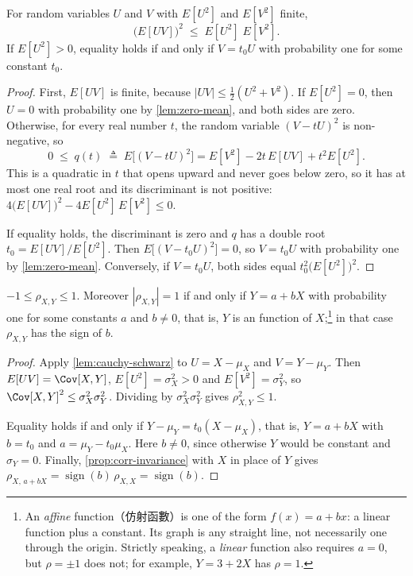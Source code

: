 \begin{lemma}\label{lem:cauchy-schwarz}
	For random variables $U$ and $V$ with $E[U^{2}]$ and $E[V^{2}]$ finite,
	\[
		\bigl(E[UV]\bigr)^{2} \;\le\; E[U^{2}]\;E[V^{2}] .
	\]
	If $E[U^{2}]>0$, equality holds if and only if $V=t_{0}U$ with probability one for some constant $t_{0}$.
\end{lemma}

\begin{proof}
	First, $E[UV]$ is finite, because $|UV|\le\tfrac12(U^{2}+V^{2})$.
	If $E[U^{2}]=0$, then $U=0$ with probability one by \autoref{lem:zero-mean}, and both sides are zero.
	Otherwise, for every real number $t$, the random variable $(V-tU)^{2}$ is non-negative, so
	\[
		0 \;\le\; q(t) \;\triangleq\; E\bigl[(V-tU)^{2}\bigr]
		= E[V^{2}] - 2t\,E[UV] + t^{2}E[U^{2}] .
	\]
	This is a quadratic in $t$ that opens upward and never goes below zero, so it has at most one real root and its discriminant is not positive:
	$4\bigl(E[UV]\bigr)^{2}-4E[U^{2}]\,E[V^{2}]\le0$.

	If equality holds, the discriminant is zero and $q$ has a double root $t_{0}=E[UV]/E[U^{2}]$.
	Then $E\bigl[(V-t_{0}U)^{2}\bigr]=0$, so $V=t_{0}U$ with probability one by \autoref{lem:zero-mean}.
	Conversely, if $V=t_{0}U$, both sides equal $t_{0}^{2}\bigl(E[U^{2}]\bigr)^{2}$.
\end{proof}

\begin{theorem}\label{thm:corr-range}
	$-1\le\rho_{X,Y}\le1$.
	Moreover $|\rho_{X,Y}|=1$ if and only if $Y=a+bX$ with probability one for some constants $a$ and $b\ne0$, that is, $Y$ is an  function of $X$;\footnote{An \emph{affine} function（仿射函數）is one of the form $f(x)=a+bx$: a linear function plus a constant. Its graph is any straight line, not necessarily one through the origin. Strictly speaking, a \emph{linear} function also requires $a=0$, but $\rho=\pm1$ does not; for example, $Y=3+2X$ has $\rho=1$.}
	in that case $\rho_{X,Y}$ has the sign of $b$.
\end{theorem}

\begin{proof}
	Apply \autoref{lem:cauchy-schwarz} to $U=X-\mu_{X}$ and $V=Y-\mu_{Y}$.
	Then $E[UV]=\Cov[X,Y]$, $E[U^{2}]=\sigma_{X}^{2}>0$ and $E[V^{2}]=\sigma_{Y}^{2}$, so $\Cov[X,Y]^{2}\le\sigma_{X}^{2}\sigma_{Y}^{2}$.
	Dividing by $\sigma_{X}^{2}\sigma_{Y}^{2}$ gives $\rho_{X,Y}^{2}\le1$.

	Equality holds if and only if $Y-\mu_{Y}=t_{0}(X-\mu_{X})$, that is, $Y=a+bX$ with $b=t_{0}$ and $a=\mu_{Y}-t_{0}\mu_{X}$.
	Here $b\ne0$, since otherwise $Y$ would be constant and $\sigma_{Y}=0$.
	Finally, \autoref{prop:corr-invariance} with $X$ in place of $Y$ gives $\rho_{X,\,a+bX}=\operatorname{sign}(b)\,\rho_{X,X}=\operatorname{sign}(b)$.
\end{proof}

